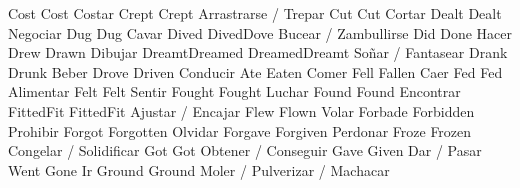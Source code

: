	            {Cost}{}	            {Cost}{}                {Costar}{}
	            {Crept}{}	            {Crept}{}               {Arrastrarse / Trepar}{}
	            {Cut}{}	                {Cut}{}                 {Cortar}{}
	            {Dealt}{}	            {Dealt}{}               {Negociar}{}
	            {Dug}{}	                {Dug}{}                 {Cavar}{}
	            {Dived}{}	            {Dived}{Dove}           {Bucear / Zambullirse}{}
	                {Did}{}	                {Done}{}                {Hacer}{}
	            {Drew}{}	            {Drawn}{}               {Dibujar}{}
	            {Dreamt}{Dreamed}	    {Dreamed}{Dreamt}       {Soñar / Fantasear}{}
	            {Drank}{}	            {Drunk}{}               {Beber}{}
	            {Drove}{}	            {Driven}{}              {Conducir}{}
	            {Ate}{}	                {Eaten}{}               {Comer}{}
	            {Fell}{}	            {Fallen}{}              {Caer}{}
	            {Fed}{}	                {Fed}{}                 {Alimentar}{}
	            {Felt}{}	            {Felt}{}                {Sentir}{}
	            {Fought}{}	            {Fought}{}              {Luchar}{}
	            {Found}{}	            {Found}{}               {Encontrar}{}
	            {Fitted}{Fit}	        {Fitted}{Fit}           {Ajustar / Encajar}{}
	            {Flew}{}	            {Flown}{}               {Volar}{}
	            {Forbade}{}	            {Forbidden}{}           {Prohibir}{}
	            {Forgot}{}	            {Forgotten}{}           {Olvidar}{}
	        {Forgave}{}	            {Forgiven}{}            {Perdonar}{}
	            {Froze}{}	            {Frozen}{}              {Congelar / Solidificar}{}
	            {Got}{}	                {Got}{}                 {Obtener / Conseguir}{}
	            {Gave}{}	            {Given}{}               {Dar / Pasar}{}
	                {Went}{}	            {Gone}{}                {Ir}{}
	            {Ground}{}	            {Ground}{}              {Moler / Pulverizar / Machacar}{}
